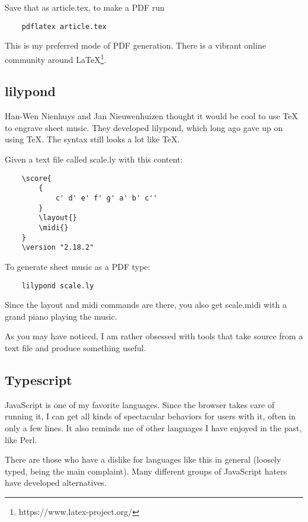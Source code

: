 Save that as article.tex, to make a PDF run

{\footnotesize
\begin{verbatim}
    pdflatex article.tex
\end{verbatim}
}

This is my preferred mode of PDF generation. There is a vibrant
online community around LaTeX\footnote{https://www.latex-project.org/}.

\subsection{lilypond}

Han-Wen Nienhuys and Jan Nieuwenhuizen thought it would be
cool to use TeX to engrave sheet music. They developed lilypond,
which long ago gave up on using TeX. The syntax still looks a lot
like TeX.

Given a text file called scale.ly with this content:

{\footnotesize
\begin{verbatim}
    \score{
        {
            c' d' e' f' g' a' b' c''
        }
        \layout{}
        \midi{}
    }
    \version "2.18.2"
\end{verbatim}
}

To generate sheet music as a PDF type:

{\footnotesize
\begin{verbatim}
    lilypond scale.ly
\end{verbatim}
}

Since the layout and midi commands are there, you also get scale.midi
with a grand piano playing the music.

As you may have noticed, I am rather obsessed with tools that take
source from a text file and produce something useful.

\subsection{Typescript}

JavaScript is one of my favorite languages. Since the browser takes
care of running it, I can get all kinds of spectacular behaviors
for users with it, often in only a few lines. It also reminds me
of other languages I have enjoyed in the past, like Perl.

There are those who have a dislike for languages like this in general
(loosely typed, being the main complaint). Many different groups of
JavaScript haters have developed alternatives.

